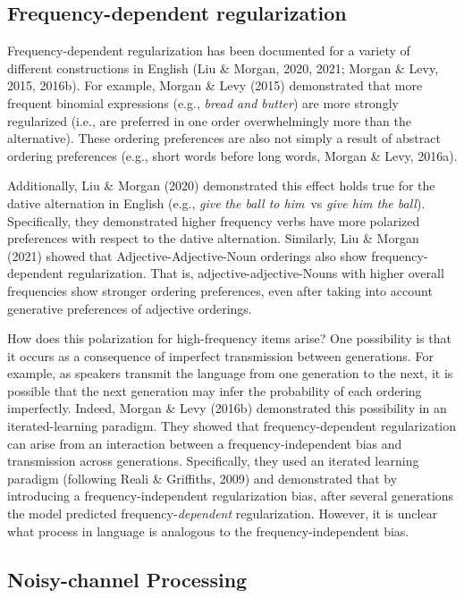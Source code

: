 \documentclass[10pt, letterpaper]{article}
\begin{document}
\hypertarget{frequency-dependent-regularization}{%
\subsection{Frequency-dependent
regularization}\label{frequency-dependent-regularization}}

Frequency-dependent regularization has been documented for a variety of
different constructions in English (Liu \& Morgan, 2020, 2021; Morgan \&
Levy, 2015, 2016b). For example, Morgan \& Levy (2015) demonstrated that
more frequent binomial expressions (e.g., \emph{bread and butter}) are
more strongly regularized (i.e., are preferred in one order
overwhelmingly more than the alternative). These ordering preferences
are also not simply a result of abstract ordering preferences (e.g.,
short words before long words, Morgan \& Levy, 2016a).

Additionally, Liu \& Morgan (2020) demonstrated this effect holds true
for the dative alternation in English (e.g., \emph{give} \emph{the ball
to him}~vs \emph{give him the ball}). Specifically, they demonstrated
higher frequency verbs have more polarized preferences with respect to
the dative alternation. Similarly, Liu \& Morgan (2021) showed that
Adjective-Adjective-Noun orderings also show frequency-dependent
regularization. That is, adjective-adjective-Nouns with higher overall
frequencies show stronger ordering preferences, even after taking into
account generative preferences of adjective orderings.

How does this polarization for high-frequency items arise? One
possibility is that it occurs as a consequence of imperfect transmission
between generations. For example, as speakers transmit the language from
one generation to the next, it is possible that the next generation may
infer the probability of each ordering imperfectly. Indeed, Morgan \&
Levy (2016b) demonstrated this possibility in an iterated-learning
paradigm. They showed that frequency-dependent regularization can arise
from an interaction between a frequency-independent bias and
transmission across generations. Specifically, they used an iterated
learning paradigm (following Reali \& Griffiths, 2009) and demonstrated
that by introducing a frequency-independent regularization bias, after
several generations the model predicted frequency-\emph{dependent}
regularization. However, it is unclear what process in language is
analogous to the frequency-independent bias.

\hypertarget{noisy-channel-processing}{%
\subsection{Noisy-channel Processing}\label{noisy-channel-processing}}
\end{document}

